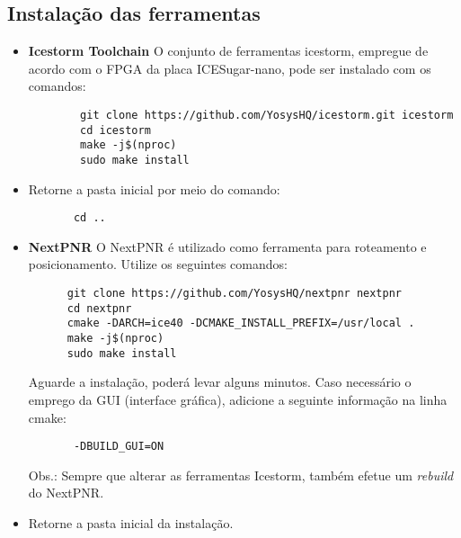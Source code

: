 \documentclass{article}
\begin{document}
\subsection{Instalação das ferramentas}
\begin{itemize}

    \item \textbf{Icestorm Toolchain}
    \textnormal{\newline O conjunto de ferramentas icestorm, empregue de acordo com o FPGA da placa ICESugar-nano, pode ser instalado com os comandos:}

    \begin{verbatim}
        git clone https://github.com/YosysHQ/icestorm.git icestorm
        cd icestorm
        make -j$(nproc)
        sudo make install
    \end{verbatim}
    
    \item Retorne a pasta inicial por meio do comando:
    \begin{verbatim}
       cd ..
    \end{verbatim}
    \vspace{08pt}



    \item \textbf{NextPNR}
    \textnormal{\newline O NextPNR é utilizado como ferramenta para roteamento e posicionamento. Utilize os seguintes comandos:}

    \begin{verbatim}
      git clone https://github.com/YosysHQ/nextpnr nextpnr
      cd nextpnr
      cmake -DARCH=ice40 -DCMAKE_INSTALL_PREFIX=/usr/local .
      make -j$(nproc)
      sudo make install
    \end{verbatim}

    \textnormal{Aguarde a instalação, poderá levar alguns minutos. Caso necessário o emprego da GUI (interface gráfica), adicione a seguinte informação na linha cmake:}
    \begin{verbatim}
       -DBUILD_GUI=ON
    \end{verbatim}
    \vspace{-0.5mm}
    \textnormal{ Obs.: Sempre que alterar as ferramentas Icestorm, também efetue um \textit{rebuild} do NextPNR.}
    \item Retorne a pasta inicial da instalação.
    \vspace{08pt}
    
    
    

\end{itemize}
\end{document}
